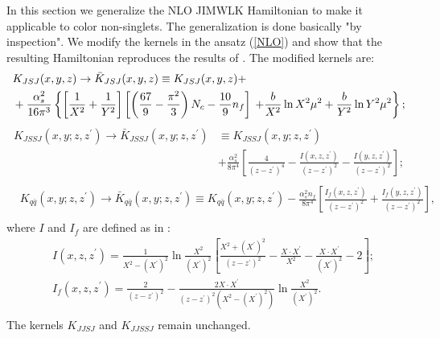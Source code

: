 \documentclass[11pt,a4paper]{article}
\begin{document}
In this section we generalize the NLO JIMWLK Hamiltonian to make it applicable to color non-singlets. The generalization is done basically "by inspection". 
We modify the kernels in the ansatz
(\ref{NLO}) and show that the resulting Hamiltonian reproduces the results of \cite{BClast}. The modified kernels are:
\begin{equation}\begin{split}
&K_{JSJ}(x,y,z)\rightarrow
\bar{K}_{JSJ}(x,y,z) \equiv K_{JSJ}(x,y,z)+\\
&+{\alpha_s^2\over 16\pi^3}\left\{\left[\frac{1}{X^{2}}+\frac{1}{Y^{2}}\right]\left[\left(\frac{67}{9}-\frac{\pi^{2}}{3}\right)N_{c}-\frac{10}{9}n_{f}\right] \right. 
\left. +\frac{b}{X^{2}}\ln X^{2}\mu^{2}+\frac{b}{Y^{2}}\ln Y^{2}\mu^{2}\right\};
 \end{split}\end{equation}
 \begin{equation}\begin{split}
K_{JSSJ}(x,y;z,z^{\prime})\rightarrow\bar{K}_{JSSJ}(x,y;z,z^{\prime})&\equiv K_{JSSJ}(x,y;z,z^{\prime})\\
&+\frac{\alpha_{s}^{2}}{8\pi^{4}}\left[\frac{4}{(z-z^{\prime})^{4}}-\frac{I(x,z,z^{\prime})}{(z-z^{\prime})^{2}}-\frac{I(y,z,z^{\prime})}{(z-z^{\prime})^{2}}\right];\\ 
\end{split}\end{equation}
\begin{equation}\begin{split}
&K_{q\bar{q}}(x,y;z,z^{\prime})\rightarrow \bar{K}_{q\bar{q}}(x,y;z,z^{\prime})\equiv K_{q\bar{q}}(x,y;z,z^{\prime})-\frac{\alpha_{s}^{2}n_{f}}{8\pi^{4}}\left[\frac{I_{f}(x,z,z^{\prime})}{(z-z^{\prime})^{2}}+\frac{I_{f}(y,z,z^{\prime})}{(z-z^{\prime})^{2}}\right], \\
\end{split}\end{equation}
where $I$ and $I_f$ are defined as in \cite{BClast}:
\begin{equation}\begin{split}
&I(x,z,z^{\prime})=\frac{1}{X^{2}-(X^{\prime})^{2}}\ln\frac{X^{2}}{(X^{\prime})^{2}}\left[\frac{X^{2}+(X^{\prime})^{2}}{(z-z^{\prime})^{2}}-\frac{X\cdot X^{\prime}}{X^{2}}-\frac{X\cdot X^{\prime}}{(X^{\prime})^{2}}-2\right];\\
&I_{f}(x,z,z^{\prime})=\frac{2}{(z-z^{\prime})^{2}}-\frac{2X\cdot X^{\prime}}{(z-z^{\prime})^{2}(X^{2}-(X^{\prime})^{2})}\ln\frac{X^{2}}{(X^{\prime})^{2}}.\\
\end{split}\end{equation}
The kernels $K_{JJSJ}$  and $K_{JJSSJ}$ remain unchanged.
\end{document}
